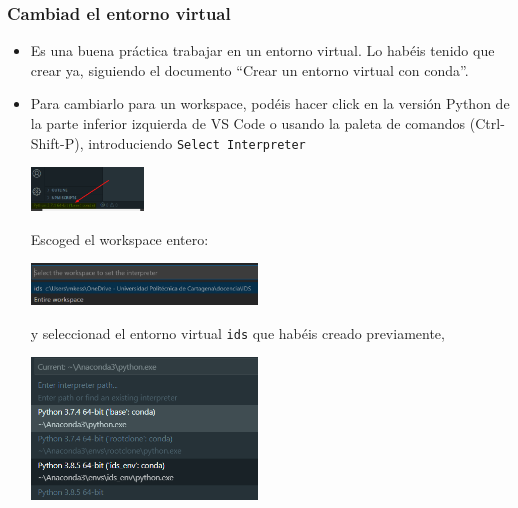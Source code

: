 \documentclass[9pt]{beamer}
\begin{document}
\begin{frame}
  \frametitle{Cambiad el entorno virtual}
  \begin{itemize}
  \item   Es una buena práctica trabajar en un entorno virtual. Lo habéis
    tenido que crear ya, siguiendo el documento ``Crear un entorno
    virtual con conda''.
  \item Para cambiarlo para un workspace, podéis
    hacer click en la versión Python de la parte inferior izquierda de
    VS Code o usando la paleta de comandos (Ctrl-Shift-P), introduciendo {\tt Select Interpreter} 
    \begin{center}
      \includegraphics[width=3cm]{change_interpreter_01}
    \end{center}
    Escoged el workspace entero:
    \begin{center}
      \includegraphics[width=6cm]{change_interpreter_02}
    \end{center}
    y seleccionad el entorno virtual {\tt ids} que habéis creado previamente,    \begin{center}
      \includegraphics[width=6cm]{change_interpreter_03}
    \end{center}
 
  \end{itemize}
 
\end{frame}
\end{document}

